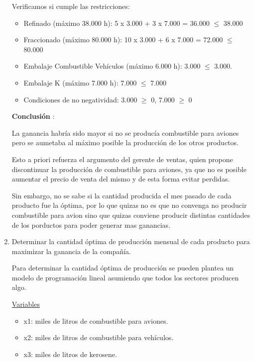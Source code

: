 \documentclass[10pt,a4paper]{article}
\begin{document}
\begin{enumerate}
    Verificamos si cumple las restricciones:

    \begin{itemize}

        \item Refinado (máximo 38.000 h):  5 x 3.000 + 3 x 7.000 = 36.000 $\leq$ 38.000
        \item Fraccionado (máximo 80.000 h): 10 x 3.000 + 6 x 7.000 = 72.000 $\leq$ 80.000
        \item Embalaje Combustible Vehículos (máximo 6.000 h): 3.000 $\leq$ 3.000.
        \item Embalaje K (máximo 7.000 h): 7.000 $\leq$ 7.000
        \item Condiciones de no negatividad: 3.000  $\geq$ 0, 7.000 $\geq$ 0\\

    \end{itemize}

    \textbf{Conclusión }:

    La ganancia habría sido mayor si no se producía combustible para aviones pero se aumetaba al máximo posible 
    la producción de los otros productos. 

    Esto a priori refuerza el argumento del gerente de ventas, quien propone discontinuar la producción de combustible para aviones, 
    ya que no es posible aumentar el precio de venta del mismo y de esta forma evitar perdidas.

    Sin embargo, no se sabe si la cantidad producida el mes pasado de cada producto fue la óptima, por lo que quizas no es que no convenga no producir
    combustible para avion sino que quizas conviene producir distintas cantidades de los porductos para poder generar mas ganancias.


    \item Determinar la cantidad óptima de producción mensual de cada producto para maximizar la ganancia de la compañía.
    
    Para determinar la cantidad óptima de producción se pueden plantea un modelo de programación lineal asumiendo que todos los sectores producen algo.

    \underline{Variables}

    \begin{itemize}

        \item x1: miles de litros de combustible para aviones.
        \item x2: miles de litros de combustible para vehículos.
        \item x3: miles de litros de kerosene. \\


\end{itemize}
\end{enumerate}
\end{document}
